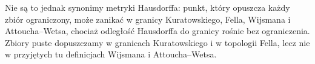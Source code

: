 Nie są to jednak synonimy metryki Hausdorffa:
punkt, który opuszcza każdy zbiór ograniczony,
może zanikać w granicy Kuratowskiego, Fella,
Wijsmana i Attoucha--Wetsa, chociaż odległość
Hausdorffa do granicy rośnie bez ograniczenia.
Zbiory puste dopuszczamy w granicach Kuratowskiego
i w topologii Fella, lecz nie w przyjętych
tu definicjach Wijsmana i Attoucha--Wetsa.